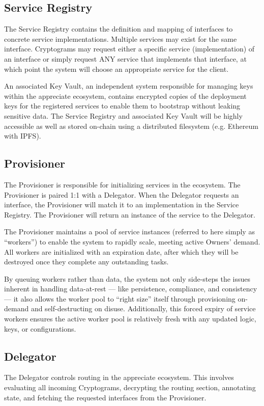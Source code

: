 \documentclass[a4paper,onecolumn, 10.5pt]{article}
\begin{document}
\subsection{Service Registry}

The Service Registry contains the definition and mapping of interfaces to concrete service implementations. Multiple services may exist for the same interface. Cryptograms may request either a specific service (implementation) of an interface or simply request ANY service that implements that interface, at which point the system will choose an appropriate service for the client.

An associated Key Vault, an independent system responsible for managing keys within the appreciate ecosystem, contains encrypted copies of the deployment keys for the registered services to enable them to bootstrap without leaking sensitive data. The Service Registry and associated Key Vault will be highly accessible as well as stored on-chain using a distributed filesystem (e.g. Ethereum with IPFS\cite{ipfs}).




\subsection{Provisioner}

The Provisioner is responsible for initializing services in the ecosystem. The Provisioner is paired 1:1 with a Delegator. When the Delegator requests an interface, the Provisioner will match it to an implementation in the Service Registry. The Provisioner will return an instance of the service to the Delegator.

The Provisioner maintains a pool of service instances (referred to here simply as “workers”) to enable the system to rapidly scale, meeting active Owners’ demand. All workers are initialized with an expiration date, after which they will be destroyed once they complete any outstanding tasks.

By queuing workers rather than data, the system not only side-steps the issues inherent in handling data-at-rest — like persistence, compliance, and consistency — it also allows the worker pool to “right size” itself through provisioning on-demand and self-destructing on disuse. Additionally, this forced expiry of service workers ensures the active worker pool is relatively fresh with any updated logic, keys, or configurations. 


\subsection{Delegator}
The Delegator controls routing in the appreciate ecosystem. This involves evaluating all incoming Cryptograms, decrypting the routing section, annotating state, and fetching the requested interfaces from the Provisioner.
\end{document}
